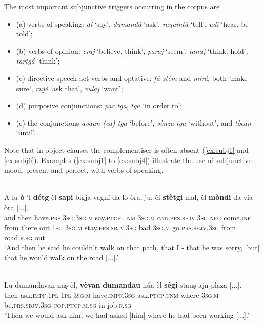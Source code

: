The most important subjunctive triggers occurring in the corpus are

\begin{itemize}
\item (a) verbs of speaking: \textit{dí} `say', \textit{dumandá} `ask', \textit{raquintá} `tell', \textit{udí} `hear, be told';
\item (b) verbs of opinion: \textit{craj} `believe, think', \textit{paraj} `seem', \textit{tanaj} `think, hold', \textit{tartgá} `think';
\item (c) directive speech act verbs and optative: \textit{fá stém} and \textit{mirá}, both `make sure', \textit{rujè} `ask that', \textit{vulaj} `want';
\item (d) purposive conjunctions: \textit{par tga}, \textit{tga} `in order to';
\item (e) the conjunctions \textit{avaun (ca) tga} `before', \textit{sènza tga} `without', and \textit{tòcan} `until'.
\end{itemize}

Note that in object clauses the complementiser is often absent (\ref{ex:subj1} and \ref{ex:subj6}). Examples (\ref{ex:subj1} to \ref{ex:subj4}) illustrate the use of subjunctive mood, present and perfect, with verbs of speaking.

\ea
\label{ex:subj1}
\\
\gll  A lu \textbf{ò} `l \textbf{détg} {\longrule} èl \textbf{sapi} bigja vagní da lò òra, ju, èl {\longrule} \textbf{stètgi} mal, èl {\longrule} \textbf{mòndi} da via òra [...].  \\
and then have.\textsc{prs.3sg} \textsc{3sg.m} say.\textsc{ptcp.unm} {} \textsc{3sg.m} can.\textsc{prs.sbjv.3sg} \textsc{neg} come.\textsc{inf} from there out \textsc{1sg} \textsc{3sg.m} {} stay.\textsc{prs.sbjv.3sg} bad \textsc{3sg.m} {} go.\textsc{prs.sbjv.3sg} from road.\textsc{f.sg} out\\
\glt `And then he said he couldn’t walk on that path, that I - that he was sorry, [but] that he would walk on the road [...].'
\z

\ea
\label{ex:subj2}
\\
\gll Lu dumandavan nuṣ èl, \textbf{vèvan} \textbf{dumandau} núa èl \textbf{ségi} stauṣ ajn plaza [...].\\
then ask.\textsc{impf.1pl} \textsc{1pl} \textsc{3sg.m} have.\textsc{impf.3sg}  ask.\textsc{ptcp.unm} where \textsc{3sg.m} be.\textsc{prs.sbjv.3sg} \textsc{cop.ptcp.m.sg} in job.\textsc{f.sg}\\
\glt `Then we would ask him, we had asked [him] where he had been working [...].'
\z

